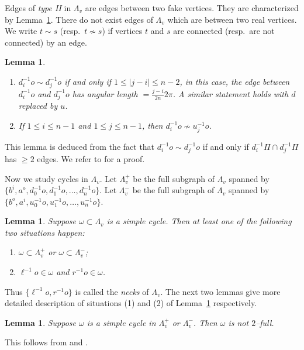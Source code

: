 \documentclass[11pt]{amsart}
\newtheorem{lemma}[theorem]{Lemma}
\theoremstyle{definition}
\newcommand{\ui}[1]{u_{#1}^{-1}}
\newcommand{\di}[1]{d_{#1}^{-1}}
\newcommand{\lemfivethree}{Lemma 5.3}
\newcommand{\lemfivesix}{Lemma 5.6}
\newcommand{\lemfiveseven}{Lemma 5.7}
\newcommand{\lemfiveeight}{Lemma 5.8}
\begin{document}
Edges of \emph{type II} in $\Lambda_v$ are edges between two fake vertices. They are characterized by Lemma~\ref{lem:edge type II}. There do not exist edges of $\Lambda_v$ which are between two real vertices. We write $t\sim s$ (resp.\ $t\nsim s$) if vertices $t$ and $s$ are connected (resp.\ are not connected) by an edge. 
\begin{lemma}\
	\label{lem:edge type II}
\begin{enumerate}
\item $d^{-1}_io\sim d^{-1}_jo$ if and only if $1\le |j-i|\le n-2$, in this case, the edge between $d^{-1}_io$ and $d^{-1}_jo$ has angular length $=\frac{j-i}{2n}2\pi$. A similar statement holds with $d$ replaced by $u$.
\item If $1\le i\le n-1$ and $1\le j\le n-1$, then $d^{-1}_io\nsim u^{-1}_jo$.
\end{enumerate}
\end{lemma}

This lemma is deduced from the fact that $d^{-1}_io\sim d^{-1}_jo$ if and only if $d^{-1}_i\Pi\cap d^{-1}_j\Pi$ has $\ge 2$ edges. We refer to 	\cite[\lemfivethree]{Artinmetric} for a proof. 

Now we study cycles in $\Lambda_v$. Let $\Lambda^+_v$ be the full subgraph of $\Lambda_v$ spanned by $\{b^i,a^o,\di{0}o,\di{1}o,\ldots,\di{n}o\}$. Let $\Lambda^-_v$ be the full subgraph of $\Lambda_v$ spanned by $\{b^o,a^i,\ui{0}o,\ui{1}o,\ldots,\ui{n}o\}$. 

\begin{lemma}	\cite[\lemfiveeight]{Artinmetric}
	\label{lem:cycle real}
Suppose $\omega\subset \Lambda_v$ is a simple cycle. Then at least one of the following two situations happen:
\begin{enumerate}
	\item $\omega\subset\Lambda^+_v$ or $\omega\subset\Lambda^-_v$;
	\item $\ell^{-1}o\in\omega$ and $r^{-1}o\in\omega$.
\end{enumerate} 
\end{lemma}

Thus $\{\ell^{-1}o,r^{-1}o\}$ is called the \emph{necks} of $\Lambda_v$. The next two lemmas give more detailed description of situations (1) and (2) of Lemma~\ref{lem:cycle real} respectively.

\begin{lemma}	
	\label{lem:not two-full}
Suppose $\omega$ is a simple cycle in $\Lambda^+_v$ or $\Lambda^-_v$. Then $\omega$ is not $2$--full.
\end{lemma}
This follows from \cite[\lemfivesix]{Artinmetric} and \cite[\lemfiveseven]{Artinmetric}.
\end{document}
